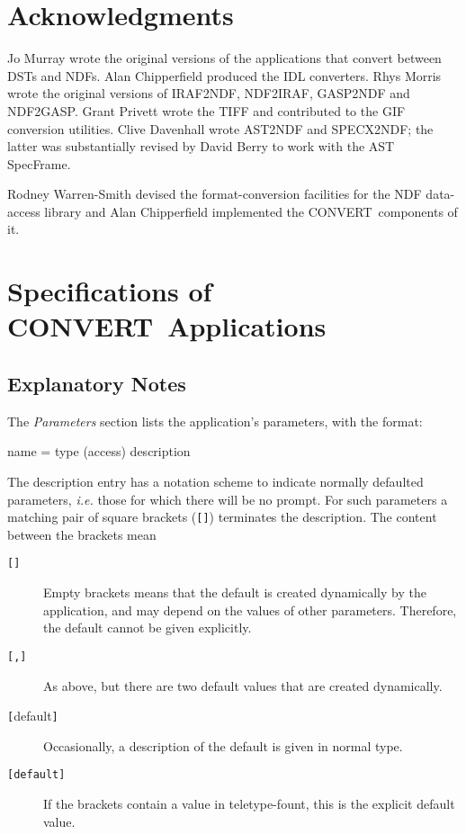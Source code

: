 \documentclass[twoside,11pt]{starlink}
\providecommand{\CONVERT}{{\footnotesize CONVERT}}
\providecommand{\BCONVERT}{{\normalsize CONVERT}}
\begin{document}
\section{Acknowledgments}
Jo Murray wrote the original versions of the applications that convert
between DSTs and NDFs.  Alan Chipperfield produced the IDL converters.
Rhys Morris wrote the original versions of IRAF2NDF, NDF2IRAF, GASP2NDF
and NDF2GASP.  Grant Privett wrote the TIFF and contributed to the GIF
conversion utilities.  Clive Davenhall wrote AST2NDF and SPECX2NDF;
the latter was substantially revised by David Berry to work with the
AST SpecFrame.

Rodney Warren-Smith devised the format-conversion facilities for the NDF
data-access library and Alan Chipperfield implemented the \CONVERT\ components
of it.

\newpage
\appendix

\section{\label{app_full}Specifications of \BCONVERT\ Applications}
\subsection{Explanatory Notes}

The \emph{Parameters} section \label{app_parameters}
lists the application's parameters, with the format:

\begin{terminalv}
     name  =  type (access)
        description
\end{terminalv}

The description entry has a notation scheme to indicate
normally defaulted parameters, \textit{i.e.} those for which there will
be no prompt.
For such parameters a matching pair of square brackets (\verb![]!)
terminates the description.  The content between the brackets mean
\begin{description}
\item[\texttt{[]}]
Empty brackets means that the default is created dynamically
by the application, and may depend on the values of other parameters.
Therefore, the default cannot be given explicitly.
\item[\texttt{[,]}]
As above, but there are two default values that are created dynamically.
\item[\texttt{[}{\textrm{default}}\texttt{]}]
Occasionally, a description of the default is given in normal type.
\item[\texttt{[default]}]
If the brackets contain a value in teletype-fount, this is the explicit
default value.
\end{description}
\end{document}
